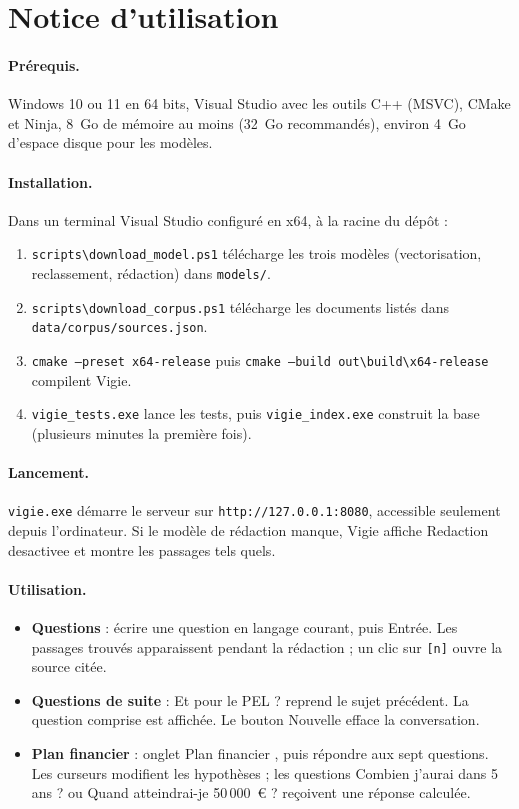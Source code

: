 \documentclass[11pt,a4paper]{article}
\begin{document}
\appendix
\sloppy
\section{Notice d'utilisation}

\paragraph{Prérequis.} Windows 10 ou 11 en 64 bits, Visual Studio avec les outils C++ (MSVC), CMake et Ninja, 8~Go de mémoire au moins (32~Go recommandés), environ 4~Go d'espace disque pour les modèles.

\paragraph{Installation.} Dans un terminal Visual Studio configuré en x64, à la racine du dépôt :
\begin{enumerate}
  \item \texttt{scripts\textbackslash download\_model.ps1} télécharge les trois modèles (vectorisation, reclassement, rédaction) dans \texttt{models/}.
  \item \texttt{scripts\textbackslash download\_corpus.ps1} télécharge les documents listés dans \texttt{data/corpus/sources.json}.
  \item \texttt{cmake --preset x64-release} puis \texttt{cmake --build out\textbackslash build\textbackslash x64-release} compilent Vigie.
  \item \texttt{vigie\_tests.exe} lance les tests, puis \texttt{vigie\_index.exe} construit la base (plusieurs minutes la première fois).
\end{enumerate}

\paragraph{Lancement.} \texttt{vigie.exe} démarre le serveur sur \texttt{http://127.0.0.1:8080}, accessible seulement depuis l'ordinateur. Si le modèle de rédaction manque, Vigie affiche \og Redaction desactivee \fg{} et montre les passages tels quels.

\paragraph{Utilisation.}
\begin{itemize}
  \item \textbf{Questions} : écrire une question en langage courant, puis Entrée. Les passages trouvés apparaissent pendant la rédaction ; un clic sur \texttt{[n]} ouvre la source citée.
  \item \textbf{Questions de suite} : \og Et pour le PEL ? \fg{} reprend le sujet précédent. La question comprise est affichée. Le bouton \og Nouvelle \fg{} efface la conversation.
  \item \textbf{Plan financier} : onglet \og Plan financier \fg, puis répondre aux sept questions. Les curseurs modifient les hypothèses ; les questions \og Combien j'aurai dans 5 ans ? \fg{} ou \og Quand atteindrai-je 50\,000~€ ? \fg{} reçoivent une réponse calculée.
\end{itemize}
\end{document}
